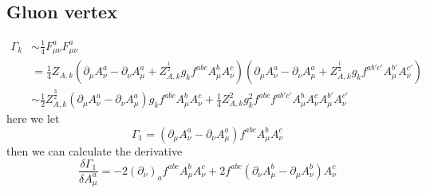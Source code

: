 \documentclass[UTF8]{article}
\begin{document}
\subsection{Gluon vertex}
\begin{equation}
\begin{split}
\Gamma_k&\sim\frac{1}{4}F^{a}_{\mu\nu}F^{a}_{\mu\nu}\\
&=\frac{1}{4}Z_{A,k}(\partial_\mu A^{a}_{\nu}-\partial_\nu A^{a}_{\mu}+Z_{A,k}^{\frac{1}{2}}g_kf^{abc}A^b_\mu A^c_\nu)(\partial_\mu A^{a}_{\nu}-\partial_\nu 
A^{a}_{\mu}+Z_{A,k}^{\frac{1}{2}}g_kf^{ab'c'}A^{b'}_\mu A^{c'}_\nu)\\
&\sim \frac{1}{2}Z^{\frac{3}{2}}_{A,k}(\partial_\mu A^{a}_{\nu}-\partial_\nu A^{a}_{\mu})g_kf^{abc}A^{b}_{\mu}A^{c}_{\nu}+\frac{1}{4}Z^{2}_{A,k}g^{2}_{k}
f^{abc}f^{ab'c'}A^{b}_{\mu}A^{c}_{\nu}A^{b'}_\mu A^{c'}_\nu
\end{split}
\end{equation}
here we let
\begin{equation}
\Gamma_1=(\partial_\mu A^{a}_{\nu}-\partial_\nu A^{a}_{\mu})f^{abc}A^{b}_{\mu}A^{c}_{\nu}
\end{equation}
then we can calculate the derivative
\begin{equation}
\frac{\delta\Gamma_1}{\delta A^{a}_{\mu}}=-2(\partial_\nu)_af^{abc}A^{b}_{\mu}A^{c}_{\nu}+2f^{abc}(\partial_\nu A^{b}_{\mu}-\partial_\mu A^{b}_{\nu})
A^{c}_{\nu}
\end{equation}
\end{document}
